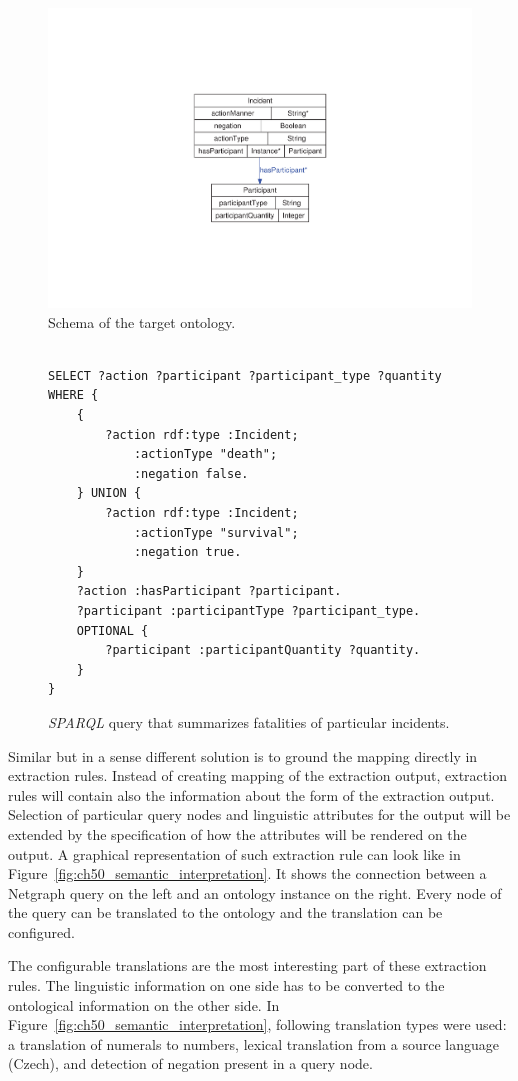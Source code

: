 \begin{figure}
	\centering
		\includegraphics[angle=-90, width=0.3\hsize]{classes}
	\caption{Schema of the target ontology.}
	\label{fig:ch50_classes}
\end{figure}

\begin{figure}
\begin{verbatim}

SELECT ?action ?participant ?participant_type ?quantity
WHERE {
	{
		?action rdf:type :Incident;
			:actionType "death";
			:negation false.
	} UNION {
		?action rdf:type :Incident;
			:actionType "survival";
			:negation true.
	}
	?action :hasParticipant ?participant.
	?participant :participantType ?participant_type.
	OPTIONAL {
		?participant :participantQuantity ?quantity.
	}
}
\end{verbatim}
\caption{\emph{SPARQL} query that summarizes fatalities of particular incidents.}
\label{fig:sparql_aggregation}
\end{figure}



Similar but in a sense different solution is to ground the mapping directly in extraction rules. Instead of creating mapping of the extraction output, extraction rules will contain also the information about the form of the extraction output. Selection of particular query nodes and linguistic attributes for the output will be extended by the specification of how the attributes will be rendered on the output. A graphical representation of such extraction rule can look like in Figure~\ref{fig:ch50_semantic_interpretation}. It shows the connection between a Netgraph query on the left and an ontology instance on the right. Every node of the query can be translated to the ontology and the translation can be configured. 

The configurable translations are the most interesting part of these extraction rules. The linguistic information on one side has to be converted to the ontological information on the other side. In Figure~\ref{fig:ch50_semantic_interpretation}, following translation types were used: a translation of numerals to numbers, lexical translation from a source language (Czech), and detection of negation present in a query node.

